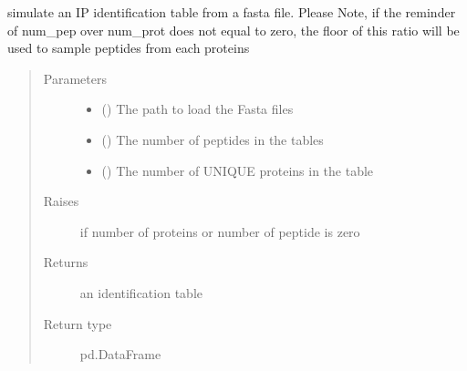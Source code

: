 \documentclass[letterpaper,10pt,english]{sphinxmanual}
\begin{document}

\begin{fulllineitems}
\label{\detokenize{IPTK.Utils:IPTK.Utils.DevFunctions.simulate_an_experimental_ident_table_from_fasta}}
simulate an IP identification table from a fasta file. Please Note,  if the reminder of num\_pep over num\_prot does not equal to zero,
the floor of this ratio will be used to sample peptides from each proteins
\begin{quote}\begin{description}
\item[{Parameters}] \leavevmode\begin{itemize}
\item {} 
 () \textendash{} The path to load the Fasta files

\item {} 
 () \textendash{} The number of peptides in the tables

\item {} 
 () \textendash{} The number of UNIQUE proteins in the table

\end{itemize}

\item[{Raises}] \leavevmode
{} \textendash{} if number of proteins or number of peptide is zero

\item[{Returns}] \leavevmode
an identification table

\item[{Return type}] \leavevmode
pd.DataFrame

\end{description}\end{quote}

\end{fulllineitems}
\end{document}
